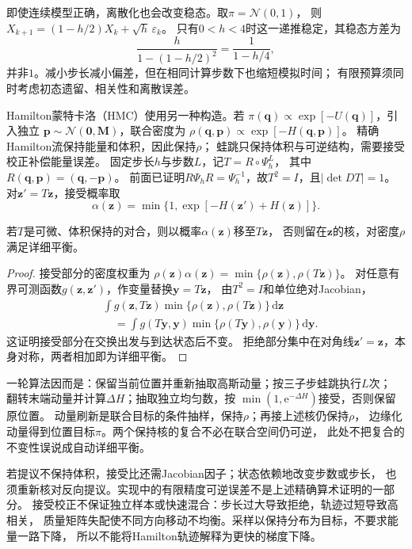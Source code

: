 即使连续模型正确，离散化也会改变稳态。取$\pi=\mathcal N(0,1)$，
则$X_{k+1}=(1-h/2)X_k+\sqrt h\,\varepsilon_k$。
只有$0<h<4$时这一递推稳定，其稳态方差为
\[
  \frac{h}{1-(1-h/2)^2}=\frac1{1-h/4},
\]
并非$1$。减小步长减小偏差，但在相同计算步数下也缩短模拟时间；
有限预算须同时考虑初态遗留、相关性和离散误差。

Hamilton蒙特卡洛（HMC）使用另一种构造。若
$\pi(\bm q)\propto\exp[-U(\bm q)]$，引入独立
$\bm p\sim\mathcal N(\bm0,\bm M)$，联合密度为
$\rho(\bm q,\bm p)\propto\exp[-H(\bm q,\bm p)]$。
精确Hamilton流保持能量和体积，因此保持$\rho$；
蛙跳只保持体积与可逆结构，需要接受校正补偿能量误差。
固定步长$h$与步数$L$，记$T=R\circ\Psi_h^L$，
其中$R(\bm q,\bm p)=(\bm q,-\bm p)$。
前面已证明$R\Psi_hR=\Psi_h^{-1}$，故$T^2=I$，且$|\det DT|=1$。
对$\bm z' =T\bm z$，接受概率取
\begin{equation}
 \alpha(\bm z)=\min\{1,\exp[-H(\bm z')+H(\bm z)]\}.
 \label{eq:dynamical-hmc-acceptance}
\end{equation}

\begin{theorem}[HMC提议的详细平衡]
 \label{thm:action-state-hmc-balance}
 若$T$是可微、体积保持的对合，则以概率$\alpha(\bm z)$移至$T\bm z$，
 否则留在$\bm z$的核，对密度$\rho$满足详细平衡。
\end{theorem}
\begin{proof}
 接受部分的密度权重为
 $\rho(\bm z)\alpha(\bm z)=\min\{\rho(\bm z),\rho(T\bm z)\}$。
 对任意有界可测函数$g(\bm z,\bm z')$，作变量替换$\bm y=T\bm z$，
 由$T^2=I$和单位绝对Jacobian，
 \[
 \begin{split}
 &\int g(\bm z,T\bm z)\min\{\rho(\bm z),\rho(T\bm z)\}\,\mathrm d\bm z\\
 &\quad=\int g(T\bm y,\bm y)
                   \min\{\rho(T\bm y),\rho(\bm y)\}\,\mathrm d\bm y .
 \end{split}
 \]
 这证明接受部分在交换出发与到达状态后不变。
 拒绝部分集中在对角线$\bm z'=\bm z$，本身对称，两者相加即为详细平衡。
\end{proof}

一轮算法因而是：保留当前位置并重新抽取高斯动量；按三子步蛙跳执行$L$次；
翻转末端动量并计算$\Delta H$；抽取独立均匀数，按
$\min(1,\mathrm e^{-\Delta H})$接受，否则保留原位置。
动量刷新是联合目标的条件抽样，保持$\rho$；再接上述核仍保持$\rho$，
边缘化动量得到位置目标$\pi$。两个保持核的复合不必在联合空间仍可逆，
此处不把复合的不变性误说成自动详细平衡。

若提议不保持体积，接受比还需Jacobian因子；状态依赖地改变步数或步长，
也须重新核对反向提议。实现中的有限精度可逆误差不是上述精确算术证明的一部分。
接受校正不保证独立样本或快速混合：步长过大导致拒绝，轨迹过短导致高相关，
质量矩阵失配使不同方向移动不均衡。采样以保持分布为目标，不要求能量一路下降，
所以不能将Hamilton轨迹解释为更快的梯度下降。

